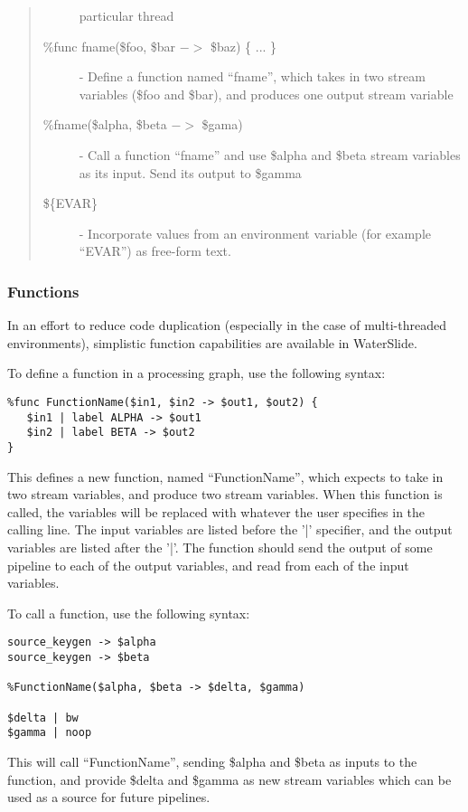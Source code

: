 \documentclass[11pt]{article}
\begin{document}
\begin{quote}
\begin{description}
particular thread
\item [\%func fname(\$foo, \$bar $->$ \$baz) \{ ... \}] - Define a function 
named ``fname'', which takes in two stream variables (\$foo and \$bar), and 
produces one output stream variable
\item [\%fname(\$alpha, \$beta $->$ \$gama)] - Call a function ``fname'' and 
use \$alpha and \$beta stream variables as its input.  Send its output to 
\$gamma
\item [\$\{EVAR\}] - Incorporate values from an environment variable (for example ``EVAR'') as free-form text.
\end{description}
\end{quote}

\subsubsection{Functions}

In an effort to reduce code duplication (especially in the case of 
multi-threaded environments), simplistic function capabilities are available 
in WaterSlide.

To define a function in a processing graph, use the following syntax:
\begin{lstlisting}
%func FunctionName($in1, $in2 -> $out1, $out2) {
   $in1 | label ALPHA -> $out1
   $in2 | label BETA -> $out2
}
\end{lstlisting}

This defines a new function, named ``FunctionName'', which expects to take 
in two stream variables, and produce two stream variables.  When this 
function is called, the variables will be replaced with whatever the user 
specifies in the calling line.   The input variables are listed before the 
'|' specifier, and the output variables are listed after the '|'.  The 
function should send the output of some pipeline to each of the output 
variables, and read from each of the input variables.

To call a function, use the following syntax:
\begin{lstlisting}
source_keygen -> $alpha
source_keygen -> $beta

%FunctionName($alpha, $beta -> $delta, $gamma)

$delta | bw
$gamma | noop
\end{lstlisting}

This will call ``FunctionName'', sending \$alpha and \$beta as inputs to the 
function, and provide \$delta and \$gamma as new stream variables which can 
be used as a source for future pipelines.
\end{document}
